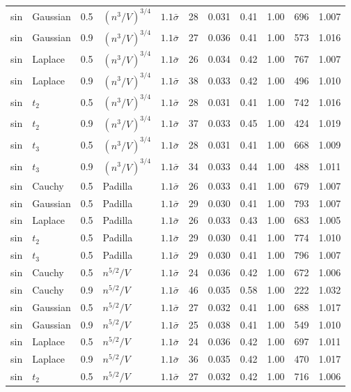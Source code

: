 \begin{longtable}{lllllcccccc}
sin & Gaussian & 0.5 & $(n^3/V)^{3/4}$ & $1.1\bar\sigma$ & 28 & 0.031 & 0.41 & 1.00 & 696 & 1.007 \\
sin & Gaussian & 0.9 & $(n^3/V)^{3/4}$ & $1.1\bar\sigma$ & 27 & 0.036 & 0.41 & 1.00 & 573 & 1.016 \\
sin & Laplace & 0.5 & $(n^3/V)^{3/4}$ & $1.1\bar\sigma$ & 26 & 0.034 & 0.42 & 1.00 & 767 & 1.007 \\
sin & Laplace & 0.9 & $(n^3/V)^{3/4}$ & $1.1\bar\sigma$ & 38 & 0.033 & 0.42 & 1.00 & 496 & 1.010 \\
sin & $t_2$ & 0.5 & $(n^3/V)^{3/4}$ & $1.1\bar\sigma$ & 28 & 0.031 & 0.41 & 1.00 & 742 & 1.016 \\
sin & $t_2$ & 0.9 & $(n^3/V)^{3/4}$ & $1.1\bar\sigma$ & 37 & 0.033 & 0.45 & 1.00 & 424 & 1.019 \\
sin & $t_3$ & 0.5 & $(n^3/V)^{3/4}$ & $1.1\bar\sigma$ & 28 & 0.031 & 0.41 & 1.00 & 668 & 1.009 \\
sin & $t_3$ & 0.9 & $(n^3/V)^{3/4}$ & $1.1\bar\sigma$ & 34 & 0.033 & 0.44 & 1.00 & 488 & 1.011 \\
sin & Cauchy & 0.5 & Padilla & $1.1\bar\sigma$ & 26 & 0.033 & 0.41 & 1.00 & 679 & 1.007 \\
sin & Gaussian & 0.5 & Padilla & $1.1\bar\sigma$ & 29 & 0.030 & 0.41 & 1.00 & 793 & 1.007 \\
sin & Laplace & 0.5 & Padilla & $1.1\bar\sigma$ & 26 & 0.033 & 0.43 & 1.00 & 683 & 1.005 \\
sin & $t_2$ & 0.5 & Padilla & $1.1\bar\sigma$ & 29 & 0.030 & 0.41 & 1.00 & 774 & 1.010 \\
sin & $t_3$ & 0.5 & Padilla & $1.1\bar\sigma$ & 29 & 0.030 & 0.41 & 1.00 & 796 & 1.007 \\
sin & Cauchy & 0.5 & $n^{5/2}/V$ & $1.1\bar\sigma$ & 24 & 0.036 & 0.42 & 1.00 & 672 & 1.006 \\
sin & Cauchy & 0.9 & $n^{5/2}/V$ & $1.1\bar\sigma$ & 46 & 0.035 & 0.58 & 1.00 & 222 & 1.032 \\
sin & Gaussian & 0.5 & $n^{5/2}/V$ & $1.1\bar\sigma$ & 27 & 0.032 & 0.41 & 1.00 & 688 & 1.017 \\
sin & Gaussian & 0.9 & $n^{5/2}/V$ & $1.1\bar\sigma$ & 25 & 0.038 & 0.41 & 1.00 & 549 & 1.010 \\
sin & Laplace & 0.5 & $n^{5/2}/V$ & $1.1\bar\sigma$ & 24 & 0.036 & 0.42 & 1.00 & 697 & 1.011 \\
sin & Laplace & 0.9 & $n^{5/2}/V$ & $1.1\bar\sigma$ & 36 & 0.035 & 0.42 & 1.00 & 470 & 1.017 \\
sin & $t_2$ & 0.5 & $n^{5/2}/V$ & $1.1\bar\sigma$ & 27 & 0.032 & 0.42 & 1.00 & 716 & 1.006 \\

\end{longtable}
